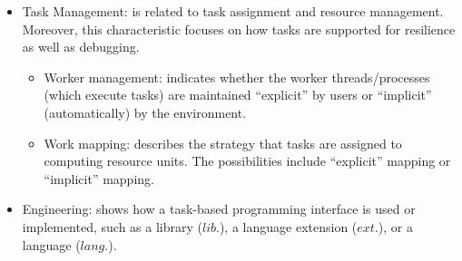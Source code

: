 \begin{itemize}
	\item Task Management: is related to task assignment and resource management. Moreover, this characteristic focuses on how tasks are supported for resilience as well as debugging.
		\begin{itemize}
			\item Worker management: indicates whether the worker threads/processes (which execute tasks) are maintained ``explicit'' by users or ``implicit'' (automatically) by the environment.
			\item Work mapping: describes the strategy that tasks are assigned to computing resource units. The possibilities include ``explicit'' mapping or ``implicit'' mapping.
		\end{itemize}
		
	\item Engineering: shows how a task-based programming interface is used or implemented, such as a library ($lib.$), a language extension ($ext.$), or a language ($lang.$).
\end{itemize}

